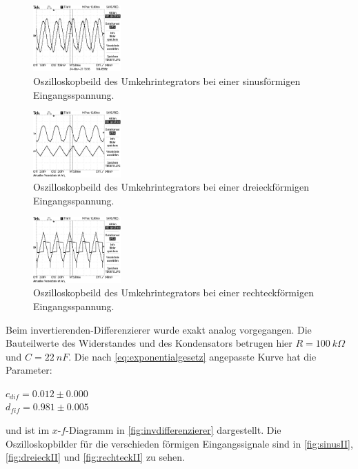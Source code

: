   \begin{figure}
    \centering
    \includegraphics[width=0.3\textwidth,angle=90]{content/grafiken/umkehrIntegrator/TEK0011.JPG}
    \caption{Oszilloskopbeild des Umkehrintegrators bei einer sinusförmigen Eingangsspannung.}
    \label{fig:sinusI}
  \end{figure}
  \begin{figure}
    \centering
    \includegraphics[width=0.3\textwidth,angle=90]{content/grafiken/umkehrIntegrator/TEK0013.JPG}
    \caption{Oszilloskopbeild des Umkehrintegrators bei einer dreieckförmigen Eingangsspannung.}
    \label{fig:dreieckI}
  \end{figure}
  \begin{figure}
    \centering
    \includegraphics[width=0.3\textwidth,angle=90]{content/grafiken/umkehrIntegrator/TEK0012.JPG}
    \caption{Oszilloskopbeild des Umkehrintegrators bei einer rechteckförmigen Eingangsspannung.}
    \label{fig:rechteckI}
  \end{figure}
\newpage
Beim invertierenden-Differenzierer wurde exakt analog vorgegangen. Die Bauteilwerte des Widerstandes 
und des Kondensators betrugen hier $R=\SI[]{100}[]{k\Omega}$ und $C=\SI[]{22}[]{nF}$. Die nach
\autoref{eq:exponentialgesetz} angepasste Kurve hat die Parameter:
\begin{center}
    $c_{dif} =    0.012 \pm 0.000$\\
    $d_{fif} =    0.981 \pm 0.005$\\
    
\end{center}
und ist im $x$-$f$-Diagramm in \autoref{fig:invdifferenzierer} dargestellt.
Die Oszilloskopbilder für die verschieden förmigen Eingangssignale sind in  \autoref{fig:sinusII},
 \autoref{fig:dreieckII} und \autoref{fig:rechteckII} zu sehen.

